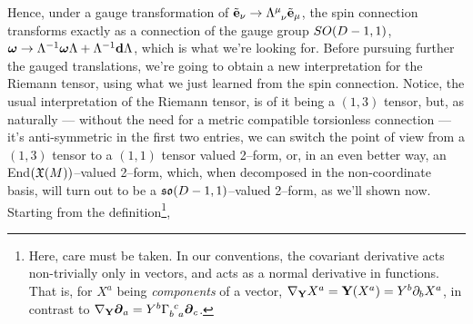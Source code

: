 Hence, under a gauge transformation of $\tilde{\vb e}_\nu\rightarrow\tensor{\Lambda}{^\mu_\nu}\tilde{\vb e}_\mu$, the spin connection transforms exactly as a connection of the gauge group $SO\qty(D-1,1)$, 
$\boldsymbol \omega\rightarrow \Lambda^{-1}\boldsymbol\omega\Lambda+\Lambda^{-1}\vb d{\Lambda}$, which is what we're looking for. Before pursuing further the gauged translations, we're going to obtain a new interpretation 
for the Riemann tensor, using what we just learned from the spin connection. Notice, the usual interpretation of the Riemann tensor, is of it being a $(1,3)$ tensor, but, as naturally --- without the need for a metric compatible 
torsionless connection --- it's anti-symmetric in the first two entries, we can switch the point of view from a $(1,3)$ tensor to a $(1,1)$ tensor valued 2--form, or, in an even better way, an End$\qty(\mathfrak X\qty(M))$--valued 2--form, 
which, when decomposed in the non-coordinate basis, will turn out to be a $\mathfrak{so}\qty(D-1,1)$--valued 2--form, as we'll shown now. Starting from the definition\footnote{Here, care must be taken. In our conventions, the covariant derivative acts non-trivially only 
in vectors, and acts as a normal derivative in functions. That is, for $X^a$ being \textit{components} of a vector, $\nabla_{\vb Y}X^a=\vb Y\qty(X^a)=Y^b\partial_b X^a$, in contrast to $\nabla_{\vb Y}\boldsymbol\partial_a=Y^b\tensor{\Gamma}{_b^c_a}\boldsymbol\partial_c$.},
